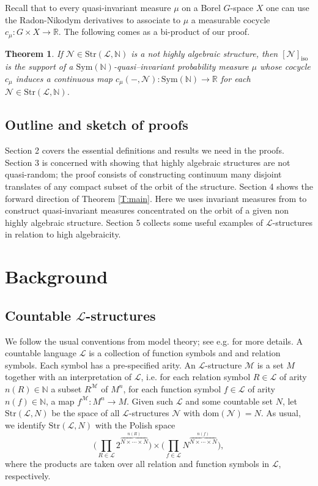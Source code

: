 \documentclass[11pt]{amsart}
\theoremstyle{plain}
\newtheorem{theorem}{Theorem}%
\theoremstyle{definition}
\newcommand{\Ell}{\mathcal{L}}
\begin{document}
Recall that to every quasi-invariant measure $\mu$ on a Borel $G$-space $X$ one can use the Radon-Nikodym derivatives to associate to $\mu$ a measurable cocycle $c_{\mu}\colon G\times X \to \mathbb{R}$.
The following comes as a bi-product of our proof.

\begin{theorem}\label{T:main2}
If $\mathcal{N}\in \mathrm{Str}(\mathcal{L},\mathbb{N})$ is a not highly algebraic structure, then $[\mathcal{N}]_{\mathrm{iso}}$  is the support of a $\mathrm{Sym}(\mathbb{N})$-quasi--invariant probability measure $\mu$  whose  cocycle $c_{\mu}$ induces a continuous map $c_{\mu}(-,\mathcal{N})\colon \mathrm{Sym}(\mathbb{N}) \to \mathbb{R}$ for each $\mathcal{N}\in  \mathrm{Str}(\mathcal{L},\mathbb{N})$.
\end{theorem}


\subsection*{Outline and sketch of proofs} Section 2 covers the essential definitions and results we need in the proofs. Section 3 is concerned with showing that highly algebraic structures are not quasi-random; the proof consists of constructing continuum many disjoint translates of any compact subset of the orbit of the structure. Section 4 shows the forward direction of Theorem \ref{T:main}. Here we 
uses invariant measures from \cite{AFP} to construct quasi-invariant measures concentrated on the orbit of a given non highly algebraic structure. 
Section 5 collects some useful examples of $\mathcal{L}$-structures in relation to high algebraicity.



\section{Background}
\subsection{Countable $\mathcal{L}$-structures}\label{SS:Background:1}
We follow the usual conventions from model theory; see e.g. \cite{Hodges} for more details.
A countable language $\mathcal{L}$ is a collection of  function symbols and  and relation symbols. Each symbol has a pre-specified arity. An $\Ell$-structure $\mathcal{M}$ is a set $M$ together with an interpretation of $\Ell$, i.e. for each relation symbol $R\in \Ell$ of arity $n(R)\in \mathbb{{N}}$ a subset $R^\mathcal{M}$ of $M^n$, for each  function symbol $f\in \Ell$ of arity $n(f)\in\mathbb{N}$, a map $f^\mathcal{M}\colon M^n \to M$. Given  such $\mathcal{L}$ and  some countable set  $N$, let $\mathrm{Str}(\mathcal{L},N)$ be the space of all $\mathcal{L}$-structures $\mathcal{N}$ with $\mathrm{dom}(\mathcal{N})=N$. As usual, we identify $\mathrm{Str}(\mathcal{L},N)$ with the Polish space
\[\big(\prod_{R \in \mathcal{L}} 2^{\overbrace{N\times\cdots \times N}^{n(R)}} \big)\times \big(\prod_{f \in \mathcal{L}} N^{{\overbrace{N\times\cdots \times N}^{n(f)}}} \big), \]
where the  products are taken over all  relation and function symbols in $\mathcal{L}$, respectively.
\end{document}
